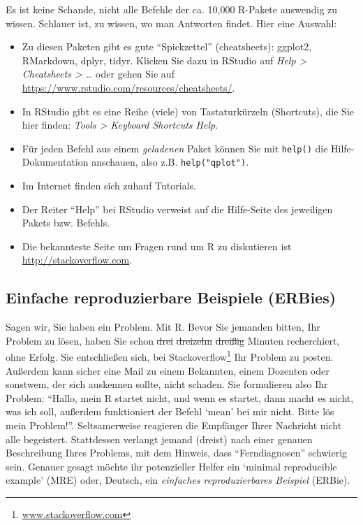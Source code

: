 \documentclass[12pt,ngerman,]{book}
\let\rmarkdownfootnote\footnote%
\def\footnote{\protect\rmarkdownfootnote}
\renewcommand{\href}[2]{#2\footnote{\url{#1}}}
\theoremstyle{definition}
\theoremstyle{definition}
\theoremstyle{remark}
\begin{document}
Es ist keine Schande, nicht alle Befehle der ca. 10,000 R-Pakete
auswendig zu wissen. Schlauer ist, zu wissen, wo man Antworten findet.
Hier eine Auswahl:

\begin{itemize}
\item
  Zu diesen Paketen gibt es gute ``Spickzettel'' (cheatsheets): ggplot2,
  RMarkdown, dplyr, tidyr. Klicken Sie dazu in RStudio auf \emph{Help
  \textgreater{} Cheatsheets \textgreater{} \ldots{}} oder gehen Sie auf
  \url{https://www.rstudio.com/resources/cheatsheets/}.
\item
  In RStudio gibt es eine Reihe (viele) von Tastaturkürzeln (Shortcuts),
  die Sie hier finden: \emph{Tools \textgreater{} Keyboard Shortcuts
  Help}.
\item
  Für jeden Befehl aus einem \emph{geladenen} Paket können Sie mit
  \texttt{help()} die Hilfe-Dokumentation anschauen, also z.B.
  \texttt{help("qplot")}.
\item
  Im Internet finden sich zuhauf Tutorials.
\item
  Der Reiter ``Help'' bei RStudio verweist auf die Hilfe-Seite des
  jeweiligen Pakets bzw. Befehls.
\item
  Die bekannteste Seite um Fragen rund um R zu diskutieren ist
  \url{http://stackoverflow.com}.
\end{itemize}

\subsection{Einfache reproduzierbare Beispiele
(ERBies)}\label{einfache-reproduzierbare-beispiele-erbies}

Sagen wir, Sie haben ein Problem. Mit R. Bevor Sie jemanden bitten, Ihr
Problem zu lösen, haben Sie schon \sout{drei} \sout{dreizehn}
\sout{dreißig} Minuten recherchiert, ohne Erfolg. Sie entschließen sich,
bei \href{www.stackoverflow.com}{Stackoverflow} Ihr Problem zu posten.
Außerdem kann sicher eine Mail zu einem Bekannten, einem Dozenten oder
sonstwem, der sich auskennen sollte, nicht schaden. Sie formulieren also
Ihr Problem: ``Hallo, mein R startet nicht, und wenn es startet, dann
macht es nicht, was ich soll, außerdem funktioniert der Befehl `mean'
bei mir nicht. Bitte lös mein Problem!''. Seltsamerweise reagieren die
Empfänger Ihrer Nachricht nicht alle begeistert. Stattdessen verlangt
jemand (dreist) nach einer genauen Beschreibung Ihres Problems, mit dem
Hinweis, dass ``Ferndiagnosen'' schwierig sein. Genauer gesagt möchte
ihr potenzieller Helfer ein `minimal reproducible example' (MRE) oder,
Deutsch, ein \emph{einfaches reproduzierbares
Beispiel} (ERBie).
\end{document}
